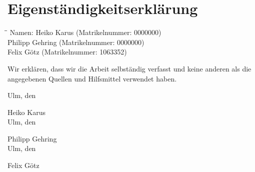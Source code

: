 \documentclass[
a4paper,
10pt, %
headsepline,           %
oneside,               %
pointlessnumbers,      %
bibtotoc,              %
]{scrbook}
\newcommand{\Heiko}{Heiko Karus}
\newcommand{\Philipp}{Philipp Gehring}
\newcommand{\Felix}{Felix Götz}
\newcommand{\Hmatnr}{0000000}
\newcommand{\Pmatnr}{0000000}
\newcommand{\Fmatnr}{1063352}
\begin{document}
\backmatter
{}
\setcounter{page}{5} %

\appendix
%
%

\backmatter

\clearpage
\printbibliography



%

%

\clearpage
\thispagestyle{empty}
\chapter{Eigenständigkeitserklärung}

\begin{tabbing}
\hspace{30mm}\=\hspace{60mm}\=\kill
Namen: \> \Heiko \> (Matrikelnummer: \Hmatnr) \\ 
  \>  \Philipp \> (Matrikelnummer: \Pmatnr) \\ 
  \>  \Felix \> (Matrikelnummer: \Fmatnr)
\end{tabbing} 


Wir erklären, dass wir die Arbeit selbständig verfasst und keine anderen als die angegebenen Quellen und Hilfsmittel verwendet haben.\vspace{2cm}

Ulm, den \dotfill

\hspace{10cm} {\footnotesize \Heiko}\\[2em]


Ulm, den \dotfill 

\hspace{10cm} {\footnotesize \Philipp} \\[2em]


Ulm, den \dotfill

\hspace{10cm} {\footnotesize \Felix}
\end{document}
